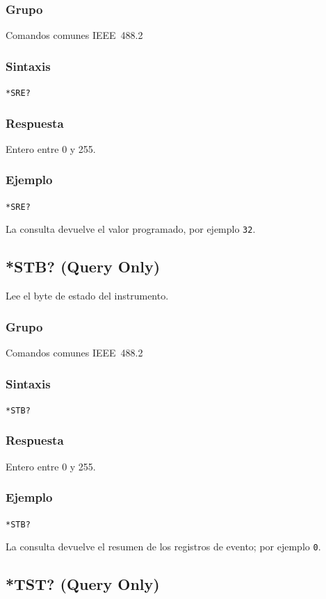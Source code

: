 \subsubsection*{Grupo}
Comandos comunes IEEE~488.2

\subsubsection*{Sintaxis}
\texttt{*SRE?}

\subsubsection*{Respuesta}
Entero entre 0 y 255.

\subsubsection*{Ejemplo}
\texttt{*SRE?}

La consulta devuelve el valor programado, por ejemplo \texttt{32}.

\subsection*{*STB? (Query Only)}

Lee el byte de estado del instrumento.

\subsubsection*{Grupo}
Comandos comunes IEEE~488.2

\subsubsection*{Sintaxis}
\texttt{*STB?}

\subsubsection*{Respuesta}
Entero entre 0 y 255.

\subsubsection*{Ejemplo}
\texttt{*STB?}

La consulta devuelve el resumen de los registros de evento; por ejemplo
\texttt{0}.

\subsection*{*TST? (Query Only)}

